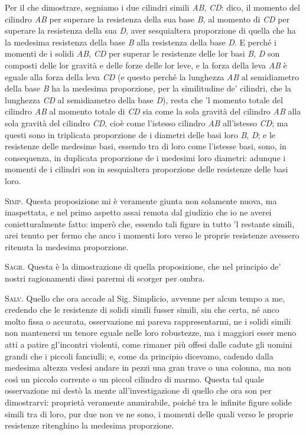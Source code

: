 \documentclass[11pt,twoside,openany]{book}
\newcommand{\speaker}[1]{\textcolor{rubric}{\textsc{#1}}\space}
\begin{document}
Per il che dimostrare, segniamo i due cilindri simili \emph{AB}, \emph{CD}: dico, il momento del cilindro \emph{AB} per superare la resistenza della sua base \emph{B}, al momento di \emph{CD} per superare la resistenza della sua \emph{D}, aver sesquialtera proporzione di quella che ha la medesima resistenza della base \emph{B} alla resistenza della base \emph{D}. E perché i momenti de i solidi \emph{AB}, \emph{CD} per superar le resistenze delle lor basi \emph{B}, \emph{D} son composti delle lor gravità e delle forze delle lor leve, e la forza della leva \emph{AB} è eguale alla forza della leva \emph{CD} (e questo perché la lunghezza \emph{AB} al semidiametro della base \emph{B} ha la medesima proporzione, per la similitudine de' cilindri, che la lunghezza \emph{CD} al semidiametro della base \emph{D}), resta che 'l momento totale del cilindro \emph{AB} al momento totale di \emph{CD} sia come la sola gravità del cilindro \emph{AB} alla sola gravità del cilindro \emph{CD}, cioè come l'istesso cilindro \emph{AB} all'istesso \emph{CD}; ma questi sono in triplicata proporzione de i diametri delle basi loro \emph{B}, \emph{D}; e le resistenze delle medesime basi, essendo tra di loro come l'istesse basi, sono, in consequenza, in duplicata proporzione de i medesimi loro diametri: adunque i momenti de i cilindri son in sesquialtera proporzione delle resistenze delle basi loro.

\speaker{Simp.} Questa proposizione mi è veramente giunta non solamente nuova, ma inaspettata, e nel primo aspetto assai remota dal giudizio che io ne averei conietturalmente fatto: imperò che, essendo tali figure in tutto 'l restante simili, arei tenuto per fermo che anco i momenti loro verso le proprie resistenze avessero ritenuta la medesima proporzione.

\speaker{Sagr.} Questa è la dimostrazione di quella proposizione, che nel principio de' nostri ragionamenti dissi parermi di scorger per ombra.

\speaker{Salv.} Quello che ora accade al Sig. Simplicio, avvenne per alcun tempo a me, credendo che le resistenze di solidi simili fusser simili, sin che certa, né anco molto fissa o accurata, osservazione mi pareva rappresentarmi, ne i solidi simili non mantenersi un tenore eguale nelle loro robustezze, ma i maggiori esser meno atti a patire gl'incontri violenti, come rimaner più offesi dalle cadute gli uomini grandi che i piccoli fanciulli; e, come da principio dicevamo, cadendo dalla medesima altezza vedesi andare in pezzi una gran trave o una colonna, ma non così un piccolo corrente o un piccol cilindro di marmo. Questa tal quale osservazione mi destò la mente all'investigazione di quello che ora son per dimostrarvi: proprietà veramente ammirabile, poiché tra le infinite figure solide simili tra di loro, pur due non ve ne sono, i momenti delle quali verso le proprie resistenze ritenghino la medesima proporzione.
\end{document}
